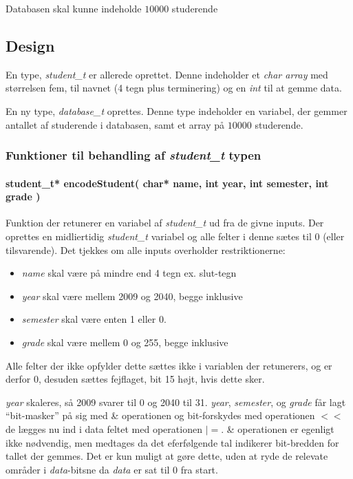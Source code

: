 Databasen skal kunne indeholde $10000$ studerende

\subsection{Design}
En type, \emph{student\_t} er allerede oprettet.
Denne indeholder et \emph{char array} med størrelsen fem,
til navnet (4 tegn plus terminering) og en \emph{int} til at gemme data.

En ny type, \emph{database\_t} oprettes. Denne type indeholder en variabel, der
gemmer antallet af studerende i databasen, samt et array på $10000$ studerende.

\subsubsection{Funktioner til behandling af \emph{student\_t} typen}
\paragraph{student\_t* encodeStudent( char* name, int year, int semester, int
grade )} Funktion der retunerer en variabel af \emph{student\_t} ud fra
de givne inputs.
Der oprettes en midliertidig \emph{student\_t} variabel og alle felter i denne
sætes til 0 (eller tilsvarende).
Det tjekkes om alle inputs overholder restriktionerne:
\begin{itemize}
	\item \emph{name} skal være på mindre end 4 tegn ex. slut-tegn
	\item \emph{year} skal være mellem 2009 og 2040, begge inklusive
	\item \emph{semester} skal være enten 1 eller 0.
	\item \emph{grade} skal være mellem 0 og 255, begge inklusive
\end{itemize}
Alle felter der ikke opfylder dette sættes ikke i variablen der retunerers, og
er derfor 0, desuden sættes fejflaget, bit 15 højt, hvis dette sker.

\emph{year} skaleres, så 2009 svarer til 0 og 2040 til 31.
\emph{year}, \emph{semester}, og \emph{grade} får lagt ``bit-masker'' på sig med
\& operationen og bit-forskydes med operationen $<<$ de lægges nu ind i data
feltet med operationen $|=$. \& operationen er egenligt ikke nødvendig, men
medtages da det eferfølgende tal indikerer bit-bredden for tallet der gemmes.
Det er kun muligt at gøre dette, uden at ryde de relevate områder i
\emph{data}-bitsne da \emph{data} er sat til 0 fra start.

